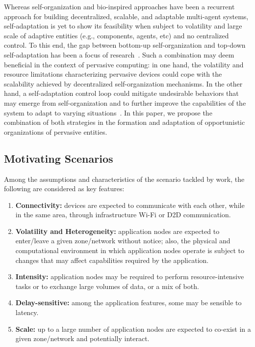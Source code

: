 Whereas self-organization and bio-inspired approaches have been a recurrent approach for building decentralized, scalable, and adaptable multi-agent systems, self-adaptation is yet to show its feasibility when subject to volatility and large scale of adaptive entities (e.g., components, agents, etc) and no centralized control. To this end, the gap between bottom-up self-organization and top-down self-adaptation has been a focus of research~\cite{Kramer:, Zambonelli:, Weyns:}. Such a combination may deem beneficial in the context of pervasive computing: in one hand, the volatility and resource limitations characterizing pervasive devices could cope with the scalability achieved by decentralized self-organization mechanisms. In the other hand, a self-adaptation control loop could mitigate undesirable behaviors that may emerge from self-organization and to further improve the capabilities of the system to adapt to varying situations~\cite{Zambonelli:}. In this paper, we propose the combination of both strategies in the formation and adaptation of opportunistic organizations of pervasive entities.


\subsection{Motivating Scenarios}\label{sec:motivating}

Among the assumptions and characteristics of the scenario tackled by work, the following are considered as key features:

\begin{enumerate}[label=C\arabic*]
	
	\item \textbf{Connectivity:} devices are expected to communicate with each other, while in the same area, through infrastructure Wi-Fi or D2D communication.
	
	\item \textbf{Volatility and Heterogeneity:} application nodes are expected to enter/leave a given zone/network without notice; also, the physical and computational environment in which application nodes operate is subject to changes that may affect capabilities required by the application.
	
	\item \textbf{Intensity:} application nodes may be required to perform resource-intensive tasks or to exchange large volumes of data, or a mix of both.
	
	\item \textbf{Delay-sensitive:} among the application features, some may be sensible to latency.
	
	\item \textbf{Scale:} up to a large number of application nodes are expected to co-exist in a given zone/network and potentially interact.

	
\end{enumerate}

